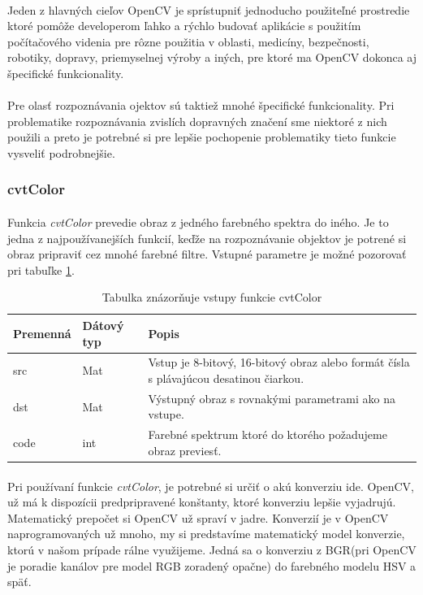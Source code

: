 \documentclass[12pt]{article}
\begin{document}
\paragraph{}
Jeden z hlavných cieľov OpenCV je sprístupniť jednoducho použiteľné prostredie ktoré pomôže developerom ľahko a rýchlo budovať aplikácie s použitím počítačového videnia
pre rôzne použitia v oblasti, medicíny, bezpečnosti, robotiky, dopravy, priemyselnej výroby a iných, pre ktoré ma OpenCV dokonca aj špecifické funkcionality.
\cite{learning_opencv}
\paragraph{}
Pre olasť rozpoznávania ojektov sú taktiež mnohé špecifické funkcionality.
Pri problematike rozpoznávania zvislích dopravných značení sme niektoré z nich použili a preto je potrebné si pre lepšie pochopenie problematiky tieto funkcie vysveliť podrobnejšie.
\subsubsection{cvtColor}
\paragraph{}
Funkcia \emph{cvtColor} prevedie obraz z jedného farebného spektra do iného. Je to jedna z najpoužívanejších funkcií, keďže na rozpoznávanie objektov je potrené si obraz pripraviť
cez mnohé farebné filtre. Vstupné parametre je možné pozorovať pri tabuľke \ref{cvtColorPar}.
\cite{cvtColor}
\cite{OpenCVDoc}
\begin{table}
	\centering
    \begin{tabular}{ | l | l | p{5cm} |}
    \hline
    Premenná & Dátový typ & Popis \\ \hline
    src & Mat & Vstup je 8-bitový, 16-bitový obraz alebo formát čísla s plávajúcou desatinou čiarkou. \\ \hline
    dst & Mat & Výstupný obraz s rovnakými parametrami ako na vstupe. \\ \hline
    code & int & Farebné spektrum ktoré do ktorého požadujeme obraz previesť. \\
    \hline
    \end{tabular}
  	\caption{Tabulka znázorňuje vstupy funkcie cvtColor}
  	\label{cvtColorPar}
\end{table}
\paragraph{}
Pri používaní funkcie \emph{cvtColor}, je potrebné si určiť o akú konverziu ide. OpenCV, už má k dispozícii predpripravené konštanty, ktoré konverziu lepšie vyjadrujú.
Matematický prepočet si OpenCV už spraví v jadre. Konverzií je v OpenCV naprogramovaných už mnoho, my si predstavíme matematický model konverzie,
ktorú v našom prípade rálne využijeme. Jedná sa o konverziu z BGR(pri OpenCV je poradie kanálov pre model RGB zoradený opačne) do farebného modelu HSV a späť.
\cite{cvtColor}
\cite{OpenCVDoc}
\end{document}
